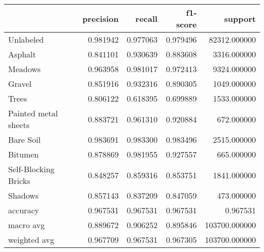\begin{tabular}{lrrrr}
\toprule
{} &  precision &    recall &  f1-score &        support \\
\midrule
Unlabeled            &   0.981942 &  0.977063 &  0.979496 &   82312.000000 \\
Asphalt              &   0.841101 &  0.930639 &  0.883608 &    3316.000000 \\
Meadows              &   0.963958 &  0.981017 &  0.972413 &    9324.000000 \\
Gravel               &   0.851916 &  0.932316 &  0.890305 &    1049.000000 \\
Trees                &   0.806122 &  0.618395 &  0.699889 &    1533.000000 \\
Painted metal sheets &   0.883721 &  0.961310 &  0.920884 &     672.000000 \\
Bare Soil            &   0.983691 &  0.983300 &  0.983496 &    2515.000000 \\
Bitumen              &   0.878869 &  0.981955 &  0.927557 &     665.000000 \\
Self-Blocking Bricks &   0.848257 &  0.859316 &  0.853751 &    1841.000000 \\
Shadows              &   0.857143 &  0.837209 &  0.847059 &     473.000000 \\
accuracy             &   0.967531 &  0.967531 &  0.967531 &       0.967531 \\
macro avg            &   0.889672 &  0.906252 &  0.895846 &  103700.000000 \\
weighted avg         &   0.967709 &  0.967531 &  0.967305 &  103700.000000 \\
\bottomrule
\end{tabular}
